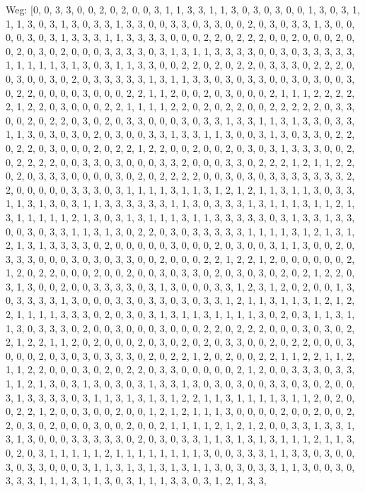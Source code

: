 \documentclass[a4paper,10pt,ngerman]{scrartcl}
\begin{document}
Weg: [0, 0, 3, 3, 0, 0, 2, 0, 2, 0, 0, 3, 1, 1, 3, 3, 1, 1, 3, 0, 3, 0, 3, 0, 0, 1, 3, 0, 3, 1, 1, 1, 3, 0, 3, 1, 3, 0, 3, 3, 1, 3, 3, 0, 0, 3, 3, 0, 3, 3, 0, 0, 2, 0, 3, 0, 3, 3, 1, 3, 0, 0, 0, 0, 3, 0, 3, 1, 3, 3, 3, 1, 1, 3, 3, 3, 3, 0, 0, 0, 2, 2, 0, 2, 2, 2, 0, 0, 2, 0, 0, 0, 2, 0, 0, 2, 0, 3, 0, 2, 0, 0, 0, 3, 3, 3, 3, 0, 3, 1, 3, 1, 1, 3, 3, 3, 3, 0, 0, 3, 0, 3, 3, 3, 3, 3, 1, 1, 1, 1, 1, 3, 1, 3, 0, 3, 1, 1, 3, 3, 0, 0, 2, 2, 0, 2, 0, 2, 2, 0, 3, 3, 3, 0, 2, 2, 2, 0, 0, 3, 0, 0, 3, 0, 2, 0, 3, 3, 3, 3, 3, 1, 3, 1, 1, 3, 3, 0, 3, 0, 3, 3, 0, 0, 3, 0, 3, 0, 0, 3, 0, 2, 2, 0, 0, 0, 0, 3, 0, 0, 0, 2, 2, 1, 1, 2, 0, 0, 2, 0, 3, 0, 0, 0, 2, 1, 1, 1, 2, 2, 2, 2, 2, 1, 2, 2, 0, 3, 0, 0, 0, 2, 2, 1, 1, 1, 1, 2, 2, 0, 2, 0, 2, 2, 0, 0, 2, 2, 2, 2, 2, 0, 3, 3, 0, 0, 2, 0, 2, 2, 0, 3, 0, 2, 0, 3, 3, 0, 0, 0, 3, 0, 3, 3, 1, 3, 3, 1, 1, 3, 1, 3, 3, 0, 3, 3, 1, 1, 3, 0, 3, 0, 3, 0, 2, 0, 3, 0, 0, 3, 3, 1, 3, 3, 1, 1, 3, 0, 0, 3, 1, 3, 0, 3, 3, 0, 2, 2, 0, 2, 2, 0, 3, 0, 0, 0, 2, 0, 2, 2, 1, 2, 2, 0, 0, 2, 0, 0, 2, 0, 3, 0, 3, 1, 3, 3, 3, 0, 0, 2, 0, 2, 2, 2, 2, 0, 0, 3, 3, 0, 3, 0, 0, 0, 3, 3, 2, 0, 0, 0, 3, 3, 0, 2, 2, 2, 1, 2, 1, 1, 2, 2, 0, 2, 0, 3, 3, 3, 0, 0, 0, 0, 3, 0, 2, 0, 2, 2, 2, 2, 0, 0, 3, 0, 3, 0, 3, 3, 3, 3, 3, 3, 3, 2, 2, 0, 0, 0, 0, 0, 3, 3, 3, 0, 3, 1, 1, 1, 1, 3, 1, 1, 3, 1, 2, 1, 2, 1, 1, 3, 1, 1, 3, 0, 3, 3, 1, 1, 3, 1, 3, 0, 3, 1, 1, 3, 3, 3, 3, 3, 3, 1, 1, 3, 0, 3, 3, 3, 1, 3, 1, 1, 1, 3, 1, 1, 2, 1, 3, 1, 1, 1, 1, 1, 2, 1, 3, 0, 3, 1, 3, 1, 1, 1, 3, 1, 1, 3, 3, 3, 3, 3, 0, 3, 1, 3, 3, 1, 3, 3, 0, 0, 3, 0, 3, 3, 1, 1, 3, 1, 3, 0, 2, 2, 0, 3, 0, 3, 3, 3, 3, 3, 1, 1, 1, 1, 3, 1, 2, 1, 3, 1, 2, 1, 3, 1, 3, 3, 3, 3, 0, 2, 0, 0, 0, 0, 0, 3, 0, 0, 0, 2, 0, 3, 0, 0, 3, 1, 1, 3, 0, 0, 2, 0, 3, 3, 3, 0, 0, 0, 3, 0, 3, 0, 3, 3, 0, 0, 2, 0, 0, 0, 2, 2, 1, 2, 2, 1, 2, 0, 0, 0, 0, 0, 0, 2, 1, 2, 0, 2, 2, 0, 0, 0, 2, 0, 0, 2, 0, 0, 3, 0, 3, 3, 0, 2, 0, 3, 0, 3, 0, 2, 0, 2, 1, 2, 2, 0, 3, 1, 3, 0, 0, 2, 0, 0, 3, 3, 3, 3, 0, 3, 1, 3, 0, 0, 0, 3, 3, 1, 2, 3, 1, 2, 0, 2, 0, 0, 1, 3, 0, 3, 3, 3, 3, 1, 3, 0, 0, 0, 3, 3, 0, 3, 3, 0, 3, 0, 3, 3, 1, 2, 1, 1, 3, 1, 1, 3, 1, 2, 1, 2, 2, 1, 1, 1, 1, 3, 3, 3, 0, 2, 0, 3, 0, 3, 1, 3, 1, 1, 3, 1, 1, 1, 1, 3, 0, 2, 0, 3, 1, 1, 3, 1, 1, 3, 0, 3, 3, 3, 0, 2, 0, 0, 3, 0, 0, 0, 3, 0, 0, 0, 2, 2, 0, 2, 2, 2, 0, 0, 0, 3, 0, 3, 0, 2, 2, 1, 2, 2, 1, 1, 2, 0, 2, 0, 0, 0, 2, 0, 3, 0, 2, 0, 2, 0, 3, 3, 0, 0, 2, 0, 2, 2, 0, 0, 0, 3, 0, 0, 0, 2, 0, 3, 0, 3, 0, 3, 3, 3, 0, 2, 0, 2, 2, 1, 2, 0, 2, 0, 0, 2, 2, 1, 1, 2, 2, 1, 1, 2, 1, 1, 2, 2, 0, 0, 0, 3, 0, 2, 0, 2, 2, 0, 3, 3, 0, 0, 0, 0, 0, 2, 1, 2, 0, 0, 3, 3, 3, 0, 3, 3, 1, 1, 2, 1, 3, 0, 3, 1, 3, 0, 3, 0, 3, 1, 3, 3, 1, 3, 0, 3, 0, 3, 0, 0, 3, 3, 0, 3, 0, 2, 0, 0, 3, 1, 3, 3, 3, 3, 0, 3, 1, 1, 3, 1, 3, 1, 3, 1, 2, 2, 1, 1, 3, 1, 1, 1, 1, 3, 1, 1, 2, 0, 2, 0, 0, 2, 2, 1, 2, 0, 0, 3, 0, 0, 2, 0, 0, 1, 2, 1, 2, 1, 1, 1, 3, 0, 0, 0, 0, 2, 0, 0, 2, 0, 0, 2, 2, 0, 3, 0, 2, 0, 0, 0, 3, 0, 0, 2, 0, 0, 2, 1, 1, 1, 1, 2, 1, 2, 1, 2, 0, 0, 3, 3, 1, 3, 3, 1, 3, 1, 3, 0, 0, 0, 3, 3, 3, 3, 3, 0, 2, 0, 3, 0, 3, 3, 1, 1, 3, 1, 3, 1, 3, 1, 1, 1, 2, 1, 1, 3, 0, 2, 0, 3, 1, 1, 1, 1, 1, 2, 1, 1, 1, 1, 1, 1, 1, 1, 3, 0, 0, 3, 3, 3, 1, 1, 3, 3, 0, 3, 0, 0, 3, 0, 3, 3, 0, 0, 0, 3, 1, 1, 3, 1, 3, 1, 3, 1, 3, 1, 1, 3, 0, 3, 0, 3, 3, 1, 1, 3, 0, 0, 3, 0, 3, 3, 3, 1, 1, 1, 3, 1, 1, 3, 0, 3, 1, 1, 1, 3, 3, 0, 3, 1, 2, 1, 3, 3, 
\end{document}
